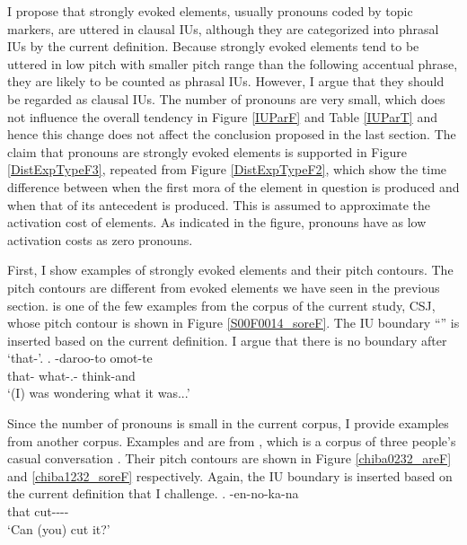 I propose that strongly evoked elements, usually pronouns coded by topic markers, are uttered in clausal IUs,
although they are categorized into phrasal IUs by the current definition.
Because strongly evoked elements tend to be uttered in low pitch with smaller pitch range than the following accentual phrase,
they are likely to be counted as phrasal IUs.
However, I argue that they should be regarded as clausal IUs.
The number of pronouns are very small, which does not influence the overall tendency in Figure \ref{IUParF} and Table \ref{IUParT} and
hence this change does not affect the conclusion proposed in the last section.
The claim that pronouns are strongly evoked elements
is supported in
Figure \ref{DistExpTypeF3},
repeated from Figure \ref{DistExpTypeF2},
which show the time difference between
when the first mora of the element in question is produced and
when that of its antecedent is produced.
This is assumed to approximate the activation cost of elements.
As indicated in the figure,
pronouns have as low activation costs as zero pronouns.

First, I show examples of strongly evoked elements and their pitch contours.
The pitch contours are different from evoked elements we have seen
in the previous section.
\Next is one of the few examples from the corpus of the current study, CSJ,
whose pitch contour is shown in Figure \ref{S00F0014_soreF}.
The IU boundary ``\iub'' is inserted based on the current definition.
I argue that there is no boundary after  `that-'.
%
\exg.\label{S00F0014_sore} \tp{\dvline} -daroo-to omot-te \tp{\dvline} \\
		that- {} what-.- think-and {} \\
		`(I) was wondering what it was...'

Since the number of pronouns is small in the current corpus,
I provide examples from another corpus.
Examples \Next and \NNext are from
,
which is a corpus of three people's casual conversation \cite{Den_2007_SAC}.
Their pitch contours are shown in Figure \ref{chiba0232_areF} and \ref{chiba1232_soreF} respectively.
Again, the IU boundary is inserted based on the current definition
that I challenge.
%
\exg.\label{chiba0232_are} \tp{\dvline} -en-no-ka-na \tp{\dvline} \\
		that {} cut---\ab{q}- {} \\
		`Can (you) cut it?'

